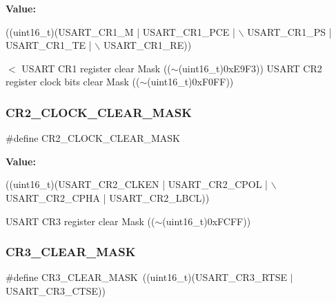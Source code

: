 {\bfseries Value\+:}
\begin{DoxyCode}
((uint16\_t)(USART\_CR1\_M | USART\_CR1\_PCE | \(\backslash\)
                                              USART\_CR1\_PS | USART\_CR1\_TE | \(\backslash\)
                                              USART\_CR1\_RE))
\end{DoxyCode}
$<$ U\+S\+A\+RT C\+R1 register clear Mask (($\sim$(uint16\+\_\+t)0x\+E9\+F3)) U\+S\+A\+RT C\+R2 register clock bits clear Mask (($\sim$(uint16\+\_\+t)0x\+F0\+FF)) \mbox{\label{group___u_s_a_r_t_ga7834b3d9be4875de242f87c12fd79f02}} 
\subsubsection{\texorpdfstring{C\+R2\+\_\+\+C\+L\+O\+C\+K\+\_\+\+C\+L\+E\+A\+R\+\_\+\+M\+A\+SK}{CR2\_CLOCK\_CLEAR\_MASK}}
{\footnotesize\ttfamily \#define C\+R2\+\_\+\+C\+L\+O\+C\+K\+\_\+\+C\+L\+E\+A\+R\+\_\+\+M\+A\+SK}

{\bfseries Value\+:}
\begin{DoxyCode}
((uint16\_t)(USART\_CR2\_CLKEN | USART\_CR2\_CPOL | \(\backslash\)
                                              USART\_CR2\_CPHA | USART\_CR2\_LBCL))
\end{DoxyCode}
U\+S\+A\+RT C\+R3 register clear Mask (($\sim$(uint16\+\_\+t)0x\+F\+C\+FF)) \mbox{\label{group___u_s_a_r_t_ga5c882571db73abc5d1837368a1cb0a64}} 
\subsubsection{\texorpdfstring{C\+R3\+\_\+\+C\+L\+E\+A\+R\+\_\+\+M\+A\+SK}{CR3\_CLEAR\_MASK}}
{\footnotesize\ttfamily \#define C\+R3\+\_\+\+C\+L\+E\+A\+R\+\_\+\+M\+A\+SK~((uint16\+\_\+t)(U\+S\+A\+R\+T\+\_\+\+C\+R3\+\_\+\+R\+T\+SE $\vert$ U\+S\+A\+R\+T\+\_\+\+C\+R3\+\_\+\+C\+T\+SE))}


